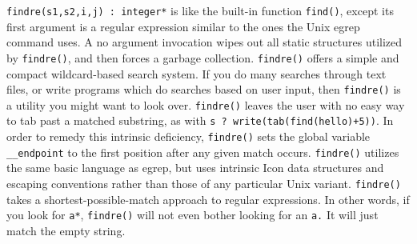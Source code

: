 \texttt{findre(s1,s2,i,j) : integer*} is like the built-in function
\texttt{find()}, except its first argument is a regular expression similar to the ones the Unix
egrep command uses. A no argument invocation wipes out all
static structures utilized by \texttt{findre()}, and
then forces a garbage collection.
\texttt{findre()} offers a simple and compact wildcard-based search
system. If you do many searches through text files, or write programs
which do searches based on user input, then \texttt{findre()} is a
utility you might want to look over. \texttt{findre()} leaves the user
with no easy way to tab past a matched substring, as with \texttt{s ?
write(tab(find({\textquotedbl}hello{\textquotedbl})+5))}. In order to
remedy this intrinsic deficiency, \texttt{findre()} sets the global
variable \texttt{\_\_endpoint} to the first position after any given
match occurs. \texttt{findre()} utilizes the same basic language as
egrep, but uses intrinsic Icon data structures and escaping conventions
rather than those of any particular Unix variant. \texttt{findre()}
takes a shortest-possible-match approach to regular expressions. In
other words, if you look for \texttt{{\textquotedbl}a*{\textquotedbl}},
\texttt{findre()} will not even bother looking for an
\texttt{{\textquotedbl}a{\textquotedbl}}\texttt{.} It will just match
the empty string.

